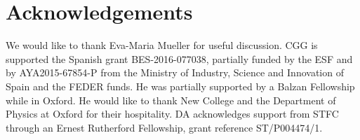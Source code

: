 \documentclass[useAMS,usenatbib]{mn2e}
\begin{document}
\section*{Acknowledgements}
We would like to thank Eva-Maria Mueller for useful discussion. CGG is
supported the Spanish grant BES-2016-077038, partially funded by the ESF and by
AYA2015-67854-P from the Ministry of Industry, Science and Innovation of Spain
and the FEDER funds. He was partially supported by a Balzan Fellowship while
in Oxford. He would like to thank New College and the Department of Physics at
Oxford for their hospitality. DA acknowledges support from STFC through an
Ernest Rutherford Fellowship, grant reference ST/P004474/1.

\setlength{\bibhang}{2.0em}
\setlength{}

\end{document}
